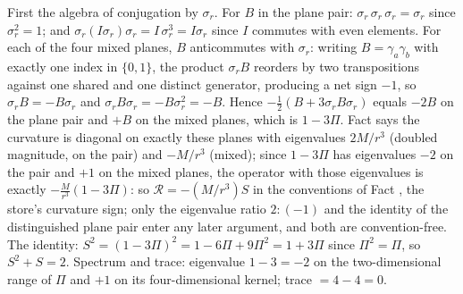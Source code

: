 First the algebra of conjugation by $\sigma_r$. For $B$ in the plane pair: $\sigma_r\,\sigma_r\,\sigma_r = \sigma_r$ since $\sigma_r^2 = 1$; and $\sigma_r (I\sigma_r)\sigma_r = I\,\sigma_r^3 = I\sigma_r$ since $I$ commutes with even elements. For each of the four mixed planes, $B$ anticommutes with $\sigma_r$: writing $B = \gamma_a\gamma_b$ with exactly one index in $\{0,1\}$, the product $\sigma_r B$ reorders by two transpositions against one shared and one distinct generator, producing a net sign $-1$, so $\sigma_r B = -B\sigma_r$ and $\sigma_r B \sigma_r = -B\sigma_r^2 = -B$. Hence $-\tfrac12(B + 3\sigma_r B\sigma_r)$ equals $-2B$ on the plane pair and $+B$ on the mixed planes, which is $1 - 3\Pi$. Fact  says the curvature is diagonal on exactly these planes with eigenvalues $2M/r^3$ (doubled magnitude, on the pair) and $-M/r^3$ (mixed); since $1 - 3\Pi$ has eigenvalues $-2$ on the pair and $+1$ on the mixed planes, the operator with those eigenvalues is exactly $-\tfrac{M}{r^3}(1 - 3\Pi)$: so $\mathcal{R} = -(M/r^3)S$ in the conventions of Fact , the store's curvature sign; only the eigenvalue ratio $2 : (-1)$ and the identity of the distinguished plane pair enter any later argument, and both are convention-free. The identity: $S^2 = (1 - 3\Pi)^2 = 1 - 6\Pi + 9\Pi^2 = 1 + 3\Pi$ since $\Pi^2 = \Pi$, so $S^2 + S = 2$. Spectrum and trace: eigenvalue $1 - 3 = -2$ on the two-dimensional range of $\Pi$ and $+1$ on its four-dimensional kernel; trace $= 4 - 4 = 0$.
